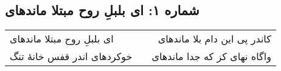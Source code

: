 \begin{center}
\section*{شماره ۱: ای بلبلِ روح مبتلا ماندهای}
\label{sec:001}
\begin{longtable}{l p{0.5cm} r}
ای بلبلِ روح مبتلا ماندهای
&&
کاندر پی این دام بلا ماندهای
\\
خوکردهای اندر قفس خانهٔ تنگ
&&
واگاه نهای کز که جدا ماندهای
\\
\end{longtable}
\end{center}
